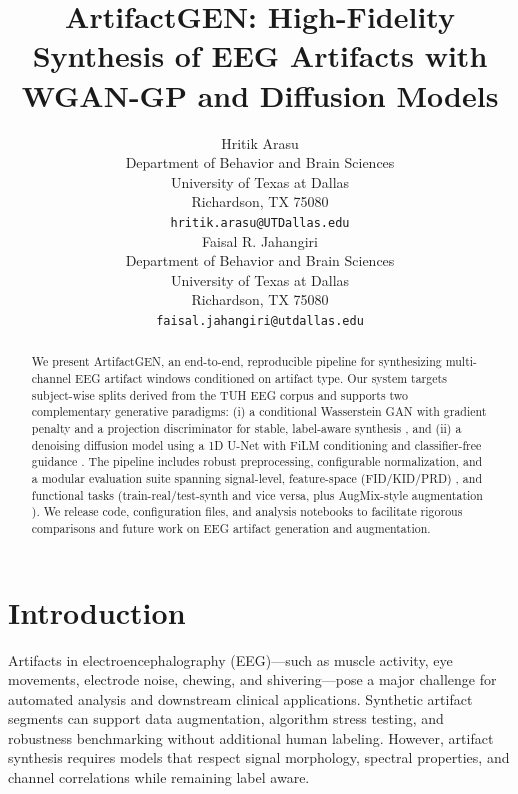 \documentclass{article}
\title{ArtifactGEN: High-Fidelity Synthesis of EEG Artifacts with WGAN-GP and Diffusion Models}
\author{
  Hritik Arasu \\
  Department of Behavior and Brain Sciences\\
  University of Texas at Dallas\\
  Richardson, TX 75080 \\
  \texttt{hritik.arasu@UTDallas.edu} \\
  \And
  Faisal R. Jahangiri \\
  Department of Behavior and Brain Sciences\\
  University of Texas at Dallas\\
  Richardson, TX 75080 \\
  \texttt{faisal.jahangiri@utdallas.edu} \\
}
\begin{document}
\maketitle

\begin{abstract}
We present ArtifactGEN, an end-to-end, reproducible pipeline for synthesizing multi-channel EEG artifact windows conditioned on artifact type. Our system targets subject-wise splits derived from the TUH EEG corpus and supports two complementary generative paradigms: (i) a conditional Wasserstein GAN with gradient penalty and a projection discriminator for stable, label-aware synthesis \citep{gulrajani2017improved,miyato2018cgans}, and (ii) a denoising diffusion model using a 1D U-Net with FiLM conditioning and classifier-free guidance \citep{ho2020denoising,ho2022classifierfree}. The pipeline includes robust preprocessing, configurable normalization, and a modular evaluation suite spanning signal-level, feature-space (FID/KID/PRD) \citep{heusel2017gans,binkowski2018demystifying,sajjadi2018assessing}, and functional tasks (train-real/test-synth and vice versa, plus AugMix-style augmentation \citep{hendrycks2020augmix}). We release code, configuration files, and analysis notebooks to facilitate rigorous comparisons and future work on EEG artifact generation and augmentation.
\end{abstract}



\section{Introduction}
Artifacts in electroencephalography (EEG)---such as muscle activity, eye movements, electrode noise, chewing, and shivering---pose a major challenge for automated analysis and downstream clinical applications. Synthetic artifact segments can support data augmentation, algorithm stress testing, and robustness benchmarking without additional human labeling. However, artifact synthesis requires models that respect signal morphology, spectral properties, and channel correlations while remaining label aware.
\end{document}
